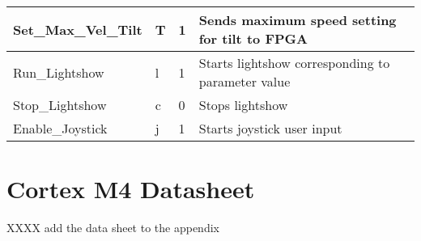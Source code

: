 \begin{table}[h]
\begin{tabular}{ | l | l | l | p{5cm} |}
     Set\_Max\_Vel\_Tilt & T & 1 & Sends maximum speed setting for tilt to FPGA \\
    \hline
    
     Run\_Lightshow & l & 1 & Starts lightshow corresponding to parameter value \\
    \hline
    
     Stop\_Lightshow & c & 0 & Stops lightshow \\
    \hline
    
    Enable\_Joystick & j & 1 & Starts joystick user input \\
    \hline
    \end{tabular}
    
\end{table}


\section{Cortex M4 Datasheet}
\label{sec:CortexM4Datasheet}
XXXX add the data sheet to the appendix
